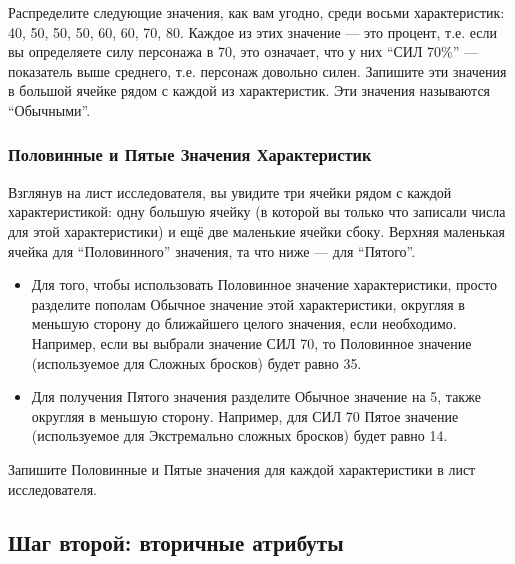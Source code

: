 \documentclass[letterpaper,twocolumn,openany, twoside, 11pt, usenames]{cocbook}
\begin{document}
Распределите следующие значения, как вам угодно, среди восьми характеристик: 40, 50, 50, 50, 60, 60, 70, 80. Каждое из этих значение --- это процент, т.е. если вы определяете силу персонажа в 70, это означает, что у них ``СИЛ 70\%'' --- показатель выше среднего, т.е. персонаж довольно силен. Запишите эти значения в большой ячейке рядом с каждой из характеристик. Эти значения называются ``Обычными''.

\subsubsection*{\nohyphens{Половинные и Пятые Значения Характеристик}}

Взглянув на лист исследователя, вы увидите три ячейки рядом с каждой характеристикой: одну большую ячейку (в которой вы только что записали числа для этой характеристики) и ещё две маленькие ячейки сбоку. Верхняя маленькая ячейка для ``Половинного'' значения, та что ниже --- для ``Пятого''.

\begin{itemize}[leftmargin=4mm]
  \item Для того, чтобы использовать Половинное значение характеристики, просто разделите пополам Обычное значение этой характеристики, округляя в меньшую сторону до ближайшего целого значения, если необходимо. Например, если вы выбрали значение СИЛ 70, то Половинное значение (используемое для Сложных бросков) будет равно 35.
  \item Для получения Пятого значения разделите Обычное значение на 5, также округляя в меньшую сторону. Например, для СИЛ 70 Пятое значение (используемое для Экстремально сложных бросков) будет равно 14.
\end{itemize}

Запишите Половинные и Пятые значения для каждой характеристики в лист исследователя.

\subsection*{Шаг второй: вторичные атрибуты}
\end{document}
